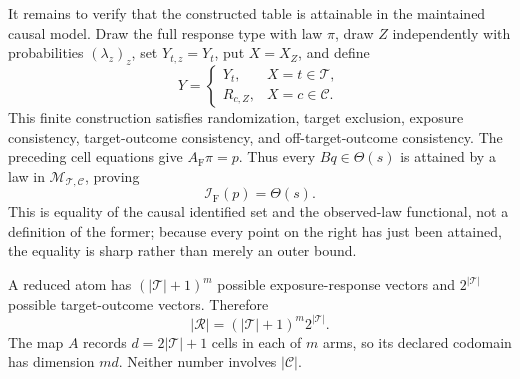 It remains to verify that the constructed table is attainable in the maintained causal model.  Draw the full response type with law \(\pi\), draw \(Z\) independently with probabilities \((\lambda_z)_z\), set \(Y_{t,z}=Y_t\), put \(X=X_Z\), and define
\[
Y=\begin{cases}
Y_t,&X=t\in\mathcal T,\\
R_{c,Z},&X=c\in\mathcal C.
\end{cases}
\]
This finite construction satisfies randomization, target exclusion, exposure consistency, target-outcome consistency, and off-target-outcome consistency.  The preceding cell equations give \(A_{\mathrm F}\pi=p\).  Thus every \(Bq\in\Theta(s)\) is attained by a law in \(\mathcal M_{\mathcal T,\mathcal C}\), proving
\[
\mathcal I_{\mathrm F}(p)=\Theta(s).
\]
This is equality of the causal identified set and the observed-law functional, not a definition of the former; because every point on the right has just been attained, the equality is sharp rather than merely an outer bound.

A reduced atom has \((|\mathcal T|+1)^m\) possible exposure-response vectors and \(2^{|\mathcal T|}\) possible target-outcome vectors.  Therefore
\[
|\mathcal R|=(|\mathcal T|+1)^m2^{|\mathcal T|}.
\]
The map \(A\) records \(d=2|\mathcal T|+1\) cells in each of \(m\) arms, so its declared codomain has dimension \(md\).  Neither number involves \(|\mathcal C|\).

